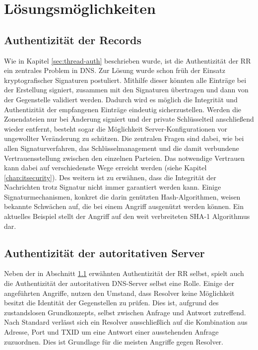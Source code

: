 \chapter{Lösungsmöglichkeiten}
\label{chap:solutions}

\section{Authentizität der Records}
\label{sec:solution-recordauth}
Wie in Kapitel \ref{sec:thread-auth} beschrieben wurde, ist die Authentizität der RR ein zentrales Problem in DNS. Zur Lösung wurde schon früh der Einsatz kryptografischer Signaturen postuliert. Mithilfe dieser könnten alle Einträge bei der Erstellung signiert, zusammen mit den Signaturen übertragen und dann von der Gegenstelle validiert werden. Dadurch wird es möglich die Integrität und Authentizität der empfangenen Einträge eindeutig sicherzustellen. Werden die Zonendateien nur bei Änderung signiert und der private Schlüsselteil anschließend wieder entfernt, besteht sogar die Möglichkeit Server-Konfigurationen vor ungewollter Veränderung zu schützen. 
Die zentralen Fragen sind dabei, wie bei allen Signaturverfahren, das Schlüsselmanagement und die damit verbundene Vertrauensstellung zwischen den einzelnen Parteien. Das notwendige Vertrauen kann dabei auf verschiedenste Wege erreicht werden (siehe Kapitel \ref{chap:itsecurity}).
Des weitern ist zu erwähnen, dass die Integrität der Nachrichten trotz Signatur nicht immer garantiert werden kann. Einige Signaturmechanismen, konkret die darin genützten Hash-Algorithmen, weisen bekannte Schwächen auf, die bei einem Angriff ausgenützt werden können. Ein aktuelles Beispiel stellt der Angriff auf den weit verbreiteten SHA-1 Algorithmus dar\cite{Stevens2017}. 

\section{Authentizität der autoritativen Server}
Neben der in Abschnitt \ref{sec:solution-recordauth} erwähnten Authentizität der RR selbst, spielt auch die Authentizität der autoritativen DNS-Server selbst eine Rolle. Einige der angeführten Angriffe, nutzen den Umstand, dass Resolver keine Möglichkeit besitzt die Identität der Gegenstellen zu prüfen. Dies ist, aufgrund des zustandslosen Grundkonzepts, selbst zwischen Anfrage und Antwort zutreffend. Nach Standard verlässt sich ein Resolver ausschließlich auf die Kombination aus Adresse, Port und TXID um eine Antwort einer ausstehenden Anfrage zuzuordnen. Dies ist Grundlage für die meisten Angriffe gegen Resolver.

